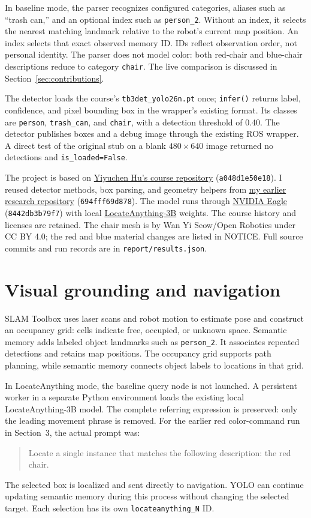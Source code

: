 \documentclass[10pt,letterpaper]{article}
\newcommand{\code}[1]{\texttt{#1}}
\begin{document}
In baseline mode, the parser recognizes configured categories, aliases such as ``trash can,'' and an optional index such as \code{person\_2}. Without an index, it selects the nearest matching landmark relative to the robot's current map position. An index selects that exact observed memory ID. IDs reflect observation order, not personal identity. The parser does not model color: both red-chair and blue-chair descriptions reduce to category \code{chair}. The live comparison is discussed in Section~\ref{sec:contributions}.

The detector loads the course's \code{tb3det\_yolo26n.pt} once; \code{infer()} returns label, confidence, and pixel bounding box in the wrapper's existing format. Its classes are \code{person}, \code{trash\_can}, and \code{chair}, with a detection threshold of 0.40. The detector publishes boxes and a debug image through the existing ROS wrapper. A direct test of the original stub on a blank $480\times640$ image returned no detections and \code{is\_loaded=False}.

The project is based on \href{https://github.com/YiyuchenHu/turtlebot3-gazebo-navigation-hw}{Yiyuchen Hu's course repository} (\code{a048d1e50e18}). I reused detector methods, box parsing, and geometry helpers from \href{https://github.com/lllingshen/turtlebot3-semantic-research}{my earlier research repository} (\code{694fff69d878}). The model runs through \href{https://github.com/NVlabs/Eagle}{NVIDIA Eagle} (\code{8442db3b79f7}) with local \href{https://huggingface.co/nvidia/LocateAnything-3B}{LocateAnything-3B} weights. The course history and licenses are retained. The chair mesh is by Wan Yi Seow/Open Robotics under CC BY 4.0; the red and blue material changes are listed in NOTICE. Full source commits and run records are in \code{report/results.json}.

\newpage
\section{Visual grounding and navigation} SLAM Toolbox uses laser scans and robot motion to estimate pose and construct an occupancy grid: cells indicate free, occupied, or unknown space. Semantic memory adds labeled object landmarks such as \code{person\_2}. It associates repeated detections and retains map positions. The occupancy grid supports path planning, while semantic memory connects object labels to locations in that grid.

In LocateAnything mode, the baseline query node is not launched. A persistent worker in a separate Python environment loads the existing local LocateAnything-3B model. The complete referring expression is preserved: only the leading movement phrase is removed. For the earlier red color-command run in Section~3, the actual prompt was:
\begin{quote}\small
Locate a single instance that matches the following description: the red chair.
\end{quote}
The selected box is localized and sent directly to navigation. YOLO can continue updating semantic memory during this process without changing the selected target. Each selection has its own \code{locateanything\_N} ID.
\end{document}
